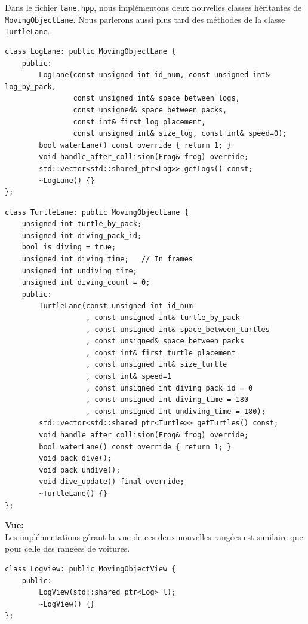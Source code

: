 \documentclass[a4paper, 12pt]{article}
\begin{document}
Dans le fichier \texttt{lane.hpp}, nous implémentons deux nouvelles classes héritantes de \texttt{MovingObjectLane}. 
Nous parlerons aussi plus tard des méthodes de la classe \texttt{TurtleLane}. \\

\begin{lstlisting}
class LogLane: public MovingObjectLane {
    public:
        LogLane(const unsigned int id_num, const unsigned int& log_by_pack,
                const unsigned int& space_between_logs,
                const unsigned& space_between_packs,
                const int& first_log_placement,
                const unsigned int& size_log, const int& speed=0);
        bool waterLane() const override { return 1; }
        void handle_after_collision(Frog& frog) override;
        std::vector<std::shared_ptr<Log>> getLogs() const;
        ~LogLane() {}
};
\end{lstlisting}

\begin{lstlisting}
class TurtleLane: public MovingObjectLane {
    unsigned int turtle_by_pack;
    unsigned int diving_pack_id;
    bool is_diving = true;
    unsigned int diving_time;   // In frames
    unsigned int undiving_time;
    unsigned int diving_count = 0;
    public:
        TurtleLane(const unsigned int id_num
                   , const unsigned int& turtle_by_pack
                   , const unsigned int& space_between_turtles
                   , const unsigned& space_between_packs
                   , const int& first_turtle_placement
                   , const unsigned int& size_turtle
                   , const int& speed=1
                   , const unsigned int diving_pack_id = 0
                   , const unsigned int diving_time = 180
                   , const unsigned int undiving_time = 180);
        std::vector<std::shared_ptr<Turtle>> getTurtles() const;
        void handle_after_collision(Frog& frog) override;
        bool waterLane() const override { return 1; }
        void pack_dive();
        void pack_undive();
        void dive_update() final override;
        ~TurtleLane() {}
};
\end{lstlisting} \hspace{0.5cm}


\underline{\textbf{Vue:}} \\
Les implémentations gérant la vue de ces deux nouvelles rangées est similaire que pour celle des rangées de voitures. \\
\begin{lstlisting}
class LogView: public MovingObjectView {
    public:
        LogView(std::shared_ptr<Log> l);
        ~LogView() {}
};
\end{lstlisting}
\end{document}

